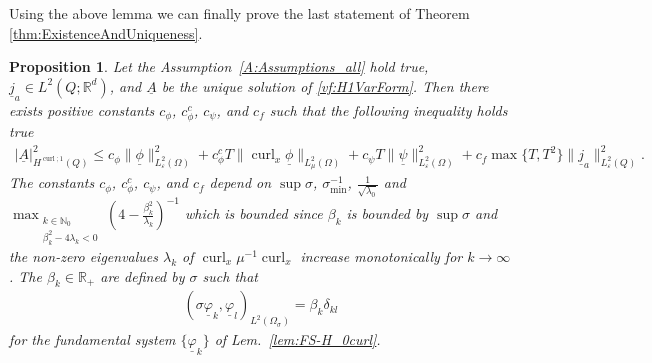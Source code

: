 \documentclass[a4paper,11pt]{article}
\newtheorem{prop}{Proposition}
\newcommand{\N}{\mathbb N}
\newcommand{\R}{\mathbb R}
\newcommand{\omsig}{\Omega_{\sigma}}
\newcommand{\cu}{\operatorname{curl}}
\renewcommand{\vec}[1]{\underline{#1}}
\begin{document}
Using the above lemma we can finally prove the last statement of Theorem \ref{thm:ExistenceAndUniqueness}.
\begin{prop}\label{prop:inequalDepRhs}
	Let the Assumption~\ref{A:Assumptions_all} hold true, $\vec j_a\in L^2(Q;\R^d)$, and $ \vec A$ be the unique solution of \eqref{vf:H1VarForm}. Then there exists positive constants  $c_\phi$, $c_\phi^c$, $c_\psi$, and $c_f$ such that the following inequality holds true
	\begin{align}
		\label{ineqn:ineq_LinDep}
		|\vec A|^2_{H^{\cu;1}(Q)}  \leq c_\phi\|\vec \phi\|^2_{L^2_{\varepsilon}({\Omega})} +c_\phi^cT\|\cu_x\vec \phi\|_{L^2_\mu({\Omega})}+c_\psi T\|\vec \psi\|^2_{L^2_{\varepsilon}({\Omega})}  + c_f \max\{T,T^2\} \|\vec j_a\|^2_{L^2_{\varepsilon}({Q})}.
	\end{align}
	The constants  $c_\phi$, $c_\phi^c$, $c_\psi$, and $c_f$  depend on $\sup\sigma$, $\sigma_{\min}^{-1}$, $\frac{1}{\sqrt{\lambda_{0}}}$ and $\max_{\substack{k\in \N_0\\\beta_k^2-4\lambda_k<0}}(4-\frac{\beta_k^2}{\lambda_k})^{-1}$ which is bounded since $\beta_k$ is bounded by $\sup\sigma$ and the non-zero eigenvalues $\lambda_k$ of $\cu_x\mu^{-1}\cu_x$ increase monotonically for $k\to\infty$. The $\beta_k\in\R_+$ are defined by $\sigma$ such that
	\begin{align*}
		(\sigma \vec \varphi_k,\vec \varphi_l)_{L^2(\omsig)} = \beta_k \delta_{kl}
	\end{align*}
	for the fundamental system $\{\vec \varphi_k\}$ of Lem.~\ref{lem:FS-H_0curl}.
\end{prop}
\end{document}
